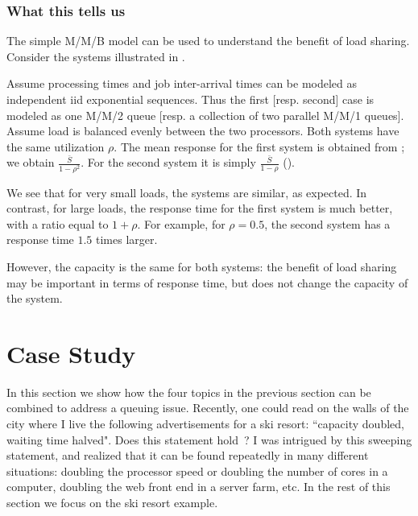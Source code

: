  \subsubsection{What this tells us}
The simple M/M/B model can be used to understand the benefit of
load sharing. Consider the systems illustrated in
.

Assume processing times and job inter-arrival
times can be modeled as independent iid
exponential sequences. Thus the first [resp.
second] case is modeled as one M/M/2 queue [resp.
a collection of two parallel M/M/1 queues].
Assume load is balanced evenly between the two
processors. Both systems have the same
utilization $\rho$. The mean response for the
first system is obtained from ;
we obtain $\frac{\bar{S}}{1-\rho^2}$. For the
second system it is simply
$\frac{\bar{S}}{1-\rho}$ ().

We see that for very small loads, the systems are
similar, as expected. In contrast, for large
loads, the response time for the first system is
much better, with a ratio equal to $1+\rho$. For
example, for $\rho=0.5$, the second system has a
response time $1.5$ times larger.

However, the capacity is the same for both
systems: the benefit of load sharing may be
important in terms of response time, but does not
change the capacity of the system.

\begin{figure}[!htbp]
\end{figure}


\section{Case Study}
 
In this section we show how the four topics in
the previous section can be combined to address a
queuing issue. Recently, one could read on the
walls of the city where I live the following
advertisements for a ski resort: ``capacity
doubled, waiting time halved". Does this
statement hold~? I was intrigued by this sweeping
statement, and realized that it can be found
repeatedly in many different situations: doubling
the processor speed or doubling the number of
cores in a computer, doubling the web front end
in a server farm, etc. In the rest of this
section we focus on the ski resort example.

